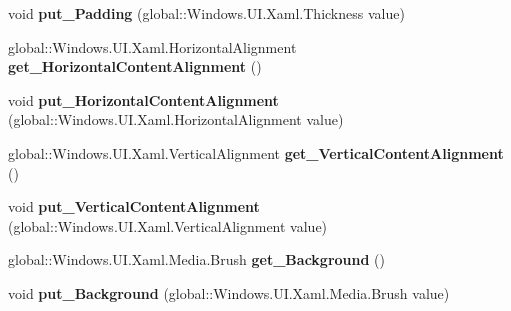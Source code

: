 \begin{DoxyCompactItemize}
\item 
\mbox{\label{interface_windows_1_1_u_i_1_1_xaml_1_1_controls_1_1_i_control_a0cb6fa986bebae13f4ec72989952a80f}} 
void {\bfseries put\+\_\+\+Padding} (global\+::\+Windows.\+U\+I.\+Xaml.\+Thickness value)
\item 
\mbox{\label{interface_windows_1_1_u_i_1_1_xaml_1_1_controls_1_1_i_control_ab7063d3439567f73075e2c9561509b3a}} 
global\+::\+Windows.\+U\+I.\+Xaml.\+Horizontal\+Alignment {\bfseries get\+\_\+\+Horizontal\+Content\+Alignment} ()
\item 
\mbox{\label{interface_windows_1_1_u_i_1_1_xaml_1_1_controls_1_1_i_control_aa4cc459384bbe6c700e3a0f0b23f633e}} 
void {\bfseries put\+\_\+\+Horizontal\+Content\+Alignment} (global\+::\+Windows.\+U\+I.\+Xaml.\+Horizontal\+Alignment value)
\item 
\mbox{\label{interface_windows_1_1_u_i_1_1_xaml_1_1_controls_1_1_i_control_ae586ce721d361940da51fcefd32816c7}} 
global\+::\+Windows.\+U\+I.\+Xaml.\+Vertical\+Alignment {\bfseries get\+\_\+\+Vertical\+Content\+Alignment} ()
\item 
\mbox{\label{interface_windows_1_1_u_i_1_1_xaml_1_1_controls_1_1_i_control_a44b19573be16bc17ab68814c38bc6981}} 
void {\bfseries put\+\_\+\+Vertical\+Content\+Alignment} (global\+::\+Windows.\+U\+I.\+Xaml.\+Vertical\+Alignment value)
\item 
\mbox{\label{interface_windows_1_1_u_i_1_1_xaml_1_1_controls_1_1_i_control_aac29873ebb350b3b04070ed6664351eb}} 
global\+::\+Windows.\+U\+I.\+Xaml.\+Media.\+Brush {\bfseries get\+\_\+\+Background} ()
\item 
\mbox{\label{interface_windows_1_1_u_i_1_1_xaml_1_1_controls_1_1_i_control_a3ff4d65a6273f87cf0e2f0258e70a641}} 
void {\bfseries put\+\_\+\+Background} (global\+::\+Windows.\+U\+I.\+Xaml.\+Media.\+Brush value)

\end{DoxyCompactItemize}
